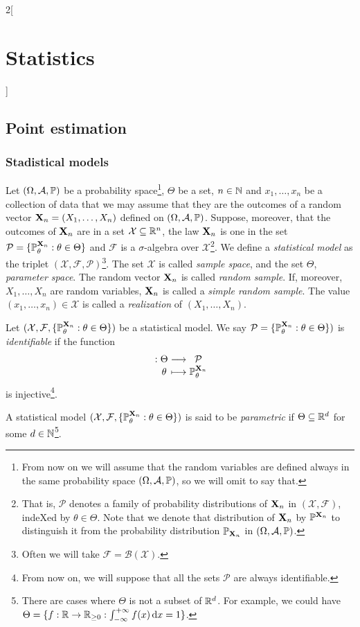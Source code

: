 \documentclass[../../../main.tex]{subfiles}
\begin{document}
\begin{multicols}{2}[\section{Statistics}]
  \subsection{Point estimation}
  \subsubsection{Stadistical models}
  \begin{definition}
    Let $(\Omega,\mathcal{A},\mathbb{P})$ be a probability space\footnote{From now on we will assume that the random variables are defined always in the same probability space $(\Omega,\mathcal{A},\mathbb{P})$, so we will omit to say that.}, $\Theta$ be a set, $n\in\mathbb{N}$ and $x_1,\ldots,x_n$ be a collection of data that we may assume that they are the outcomes of a random vector $\boldsymbol{\mathrm{X}}_n=(X_1,\ldots,X_n)$ defined on $(\Omega,\mathcal{A},\mathbb{P})$. Suppose, moreover, that the outcomes of $\boldsymbol{\mathrm{X}}_n$ are in a set $\mathcal{X}\subseteq\mathbb{R}^n$, the law $\boldsymbol{\mathrm{X}}_n$ is one in the set $\mathcal{P}=\{\mathbb{P}_\theta^{\boldsymbol{\mathrm{X}}_n}:\theta\in\Theta\}$ and $\mathcal{F}$ is a $\sigma$-algebra over $\mathcal{X}$\footnote{That is, $\mathcal{P}$ denotes a family of probability distributions of $\boldsymbol{\mathrm{X}}_n$ in $(\mathcal{X},\mathcal{F})$, indeXed by $\theta\in\Theta$. Note that we denote that distribution of $\boldsymbol{\mathrm{X}}_n$ by $\mathbb{P}^{\boldsymbol{\mathrm{X}}_n}$ to distinguish it from the probability distribution $\mathbb{P}_{\boldsymbol{\mathrm{X}}_n}$ in $(\Omega,\mathcal{A},\mathbb{P})$.}. We define a \emph{statistical model} as the triplet $(\mathcal{X},\mathcal{F},\mathcal{P})$\footnote{Often we will take $\mathcal{F}=\mathcal{B}(\mathcal{X})$.}. The set $\mathcal{X}$ is called \emph{sample space}, and the set $\Theta$, \emph{parameter space}. The random vector $\boldsymbol{\mathrm{X}}_n$ is called \emph{random sample}. If, moreover, $X_1,\ldots,X_n$ are \iid random variables, $\boldsymbol{\mathrm{X}}_n$ is called a \emph{simple random sample}. The value $(x_1,\ldots,x_n)\in\mathcal{X}$ is called a \emph{realization} of $(X_1,\ldots,X_n)$.
  \end{definition}
  \begin{definition}
    Let $(\mathcal{X},\mathcal{F},\{\mathbb{P}_\theta^{\boldsymbol{\mathrm{X}}_n}:\theta\in\Theta\})$ be a statistical model. We say $\mathcal{P}=\{\mathbb{P}_\theta^{\boldsymbol{\mathrm{X}}_n}:\theta\in\Theta\})$ is \emph{identifiable} if the function $$\function{}{\Theta}{\mathcal{P}}{\theta}{\Prob_\theta^{\vf{X}_n}}$$ is injective\footnote{From now on, we will suppose that all the sets $\mathcal{P}$ are always identifiable.}.
  \end{definition}
  \begin{definition}
    A statistical model $(\mathcal{X},\mathcal{F},\{\mathbb{P}_\theta^{\boldsymbol{\mathrm{X}}_n}:\theta\in\Theta\})$ is said to be \emph{parametric} if $\Theta\subseteq \mathbb{R}^d$ for some $d\in\mathbb{N}$\footnote{There are cases where $\Theta$ is not a subset of $\mathbb{R}^d$. For example, we could have $\Theta=\{f:\mathbb{R}\rightarrow\mathbb{R}_{\geq 0} : \int_{-\infty}^{+\infty}f(x)\dd{x}=1\}$.}.
  \end{definition}

\end{multicols}
\end{document}

